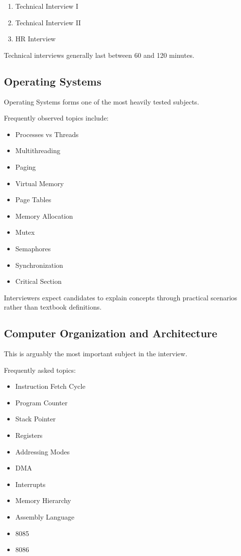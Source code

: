 \documentclass[11pt,a4paper]{article}
\begin{document}
\begin{enumerate}
	\item Technical Interview I
	\item Technical Interview II
	\item HR Interview
\end{enumerate}

Technical interviews generally last between 60 and 120 minutes.


\subsection{Operating Systems}

Operating Systems forms one of the most heavily tested subjects.

Frequently observed topics include:

\begin{itemize}
	\item Processes vs Threads
	\item Multithreading
	\item Paging
	\item Virtual Memory
	\item Page Tables
	\item Memory Allocation
	\item Mutex
	\item Semaphores
	\item Synchronization
	\item Critical Section
\end{itemize}

Interviewers expect candidates to explain concepts through practical scenarios rather than textbook definitions.


\subsection{Computer Organization and Architecture}

This is arguably the most important subject in the interview.

Frequently asked topics:

\begin{itemize}
	\item Instruction Fetch Cycle
	\item Program Counter
	\item Stack Pointer
	\item Registers
	\item Addressing Modes
	\item DMA
	\item Interrupts
	\item Memory Hierarchy
	\item Assembly Language
	\item 8085
	\item 8086
\end{itemize}
\end{document}
